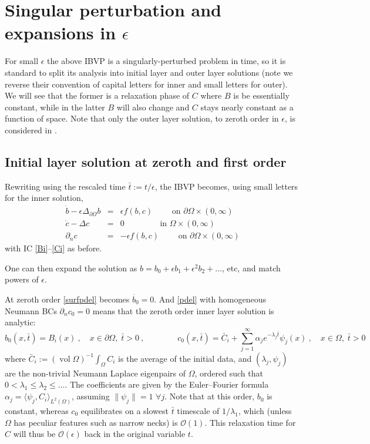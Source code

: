 \documentclass[10pt]{article}
\newcommand{\be}{\begin{equation}}
\newcommand{\ee}{\end{equation}}
\newcommand{\bea}{\begin{eqnarray}}
\newcommand{\eea}{\end{eqnarray}}
\newcommand{\bigO}{{\mathcal O}}
\newcommand{\qqquad}{\qquad\qquad}
\DeclareMathOperator{\vol}{vol}
\newcommand{\pO}{{\partial\Omega}}
\newcommand{\LpO}{\Delta_\pO}
\newcommand{\eps}{\epsilon}
\newcommand{\dn}{\partial_n}
\begin{document}
\section{Singular perturbation and expansions in $\eps$}

For small $\eps$ the above IBVP is a singularly-perturbed problem in time,
so it is standard to split its analysis into initial layer
and outer layer solutions
\cite[Sec.~3.4]{logan} \cite[Sec.~10.2]{linsegel}
(note we reverse their convention of capital letters for inner and small
letters for outer).
We will see that the former is a relaxation phase of $C$ where $B$ is be essentially constant,
while in the latter $B$ will also change and $C$ stays nearly constant as a function of space.
Note that only the outer layer solution, to zeroth order in $\eps$, is
considered in \cite{diegmiller18}.


\subsection{Initial layer solution at zeroth and first order}

Rewriting using the rescaled time $\bar{t}:=t/\eps$, the IBVP
becomes, using small letters for the inner solution,
\bea
\dot{b} - \eps\LpO b   &=&  \eps f(b,c)  \qquad \mbox{ on } \pO \times (0,\infty)
\label{surfpdel}
\\
\dot{c} - \Delta c   &=& 0   \qqquad \mbox{ in } \Omega \times (0,\infty)
\label{pdel}
\\
\dn c  &=& -\eps f(b,c) \qquad \mbox{ on } \pO \times (0,\infty)
\eea
with IC \eqref{Bi}--\eqref{Ci} as before.

One can then expand the solution as $b = b_0 + \eps b_1 + \eps^2 b_2 + \dots$,
etc, and match powers of $\eps$.

At zeroth order \eqref{surfpdel} becomes $\dot{b_0}=0$.
And \eqref{pdel} with homogeneous Neumann BCs $\dn c_0 = 0$ means that
the zeroth order inner layer solution is analytic:
\be
b_0(x,\bar{t}) = B_i(x)~,
\quad x\in\pO, \; \bar{t}>0~,
\qqquad
c_0(x,\bar{t}) = \bar{C}_i + \sum_{j=1}^\infty \alpha_j e^{-\lambda_j \bar{t}} \psi_j(x) ~,
 \quad x\in\Omega, \; \bar{t}>0
\label{BCl0}
 \ee
where $\bar{C}_i := (\vol\Omega)^{-1} \int_\Omega C_i$ is the average of the
initial data,
and $(\lambda_j, \psi_j)$ are the non-trivial Neumann Laplace eigenpairs
of $\Omega$, ordered such that $0<\lambda_1\le\lambda_2\le\dots$.
The coefficients are given by the Euler--Fourier formula
$\alpha_j = \langle \psi_j,C_i\rangle_{L^2(\Omega)}$, assuming
$\|\psi_j\|=1$ $\forall j$.
Note that at this order, $b_0$ is constant, whereas $c_0$ equilibrates on
a slowest $\bar{t}$ timescale of $1/\lambda_1$, which (unless $\Omega$
has peculiar features such as narrow necks) is $\bigO(1)$.
This relaxation time for $C$ will thus be $\bigO(\eps)$
back in the original variable $t$.
\end{document}
